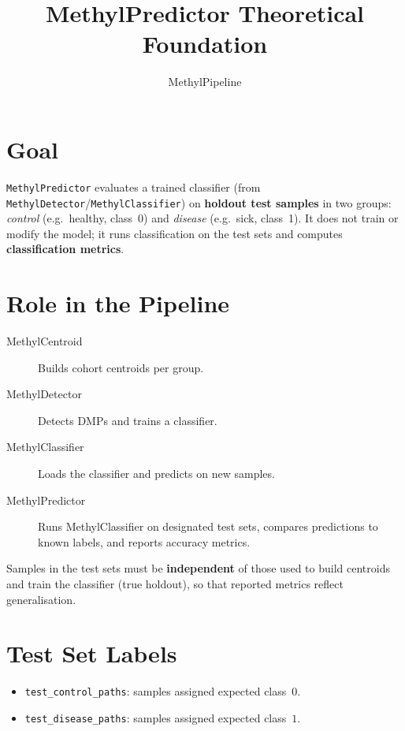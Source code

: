 \documentclass[11pt]{article}
\title{MethylPredictor Theoretical Foundation}
\author{MethylPipeline}
\date{}
\begin{document}
\maketitle
\tableofcontents
\newpage

\section{Goal}

\texttt{MethylPredictor} evaluates a trained classifier (from
\texttt{MethylDetector}/\texttt{MethylClassifier}) on \textbf{holdout test
samples} in two groups: \emph{control} (e.g.\ healthy, class~0) and
\emph{disease} (e.g.\ sick, class~1).  It does not train or modify the model;
it runs classification on the test sets and computes \textbf{classification
metrics}.

\section{Role in the Pipeline}

\begin{description}
  \item[MethylCentroid] Builds cohort centroids per group.
  \item[MethylDetector] Detects DMPs and trains a classifier.
  \item[MethylClassifier] Loads the classifier and predicts on new samples.
  \item[MethylPredictor] Runs MethylClassifier on designated test sets,
    compares predictions to known labels, and reports accuracy metrics.
\end{description}

Samples in the test sets must be \textbf{independent} of those used to build
centroids and train the classifier (true holdout), so that reported metrics
reflect generalisation.

\section{Test Set Labels}

\begin{itemize}
  \item \texttt{test\_control\_paths}: samples assigned expected class~$0$.
  \item \texttt{test\_disease\_paths}: samples assigned expected class~$1$.
\end{itemize}
\end{document}
